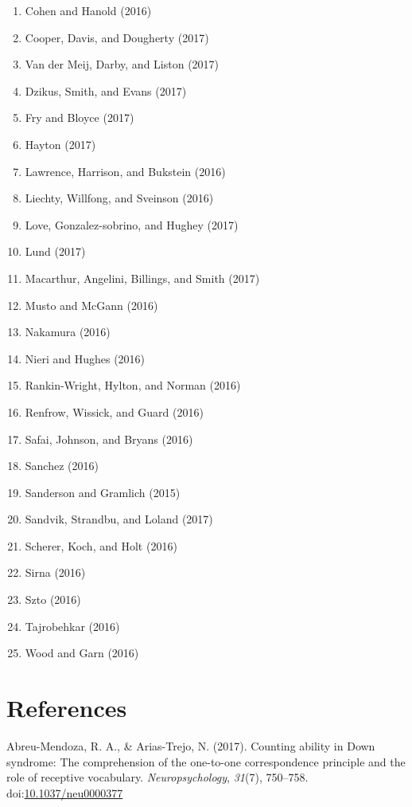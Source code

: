 \documentclass[english,man]{apa6}
\providecommand{\tightlist}{%
  \setlength{\itemsep}{0pt}\setlength{\parskip}{0pt}}
\begin{document}
\begin{enumerate}
\def\labelenumi{\arabic{enumi})}
\tightlist
\item
  Cohen and Hanold (2016)
\item
  Cooper, Davis, and Dougherty (2017)
\item
  Van der Meij, Darby, and Liston (2017)
\item
  Dzikus, Smith, and Evans (2017)
\item
  Fry and Bloyce (2017)
\item
  Hayton (2017)
\item
  Lawrence, Harrison, and Bukstein (2016)
\item
  Liechty, Willfong, and Sveinson (2016)
\item
  Love, Gonzalez-sobrino, and Hughey (2017)
\item
  Lund (2017)
\item
  Macarthur, Angelini, Billings, and Smith (2017)
\item
  Musto and McGann (2016)
\item
  Nakamura (2016)
\item
  Nieri and Hughes (2016)
\item
  Rankin-Wright, Hylton, and Norman (2016)
\item
  Renfrow, Wissick, and Guard (2016)
\item
  Safai, Johnson, and Bryans (2016)
\item
  Sanchez (2016)
\item
  Sanderson and Gramlich (2015)
\item
  Sandvik, Strandbu, and Loland (2017)
\item
  Scherer, Koch, and Holt (2016)
\item
  Sirna (2016)
\item
  Szto (2016)
\item
  Tajrobehkar (2016)
\item
  Wood and Garn (2016)
\end{enumerate}

\newpage

\section{References}\label{references}

\setlength{\parindent}{-0.5in} \setlength{\leftskip}{0.5in}

\hypertarget{refs}{}
\hypertarget{ref-Abreu-Mendoza2017}{}
Abreu-Mendoza, R. A., \& Arias-Trejo, N. (2017). Counting ability in
Down syndrome: The comprehension of the one-to-one correspondence
principle and the role of receptive vocabulary. \emph{Neuropsychology},
\emph{31}(7), 750--758.
doi:\href{https://doi.org/10.1037/neu0000377}{10.1037/neu0000377}
\end{document}
